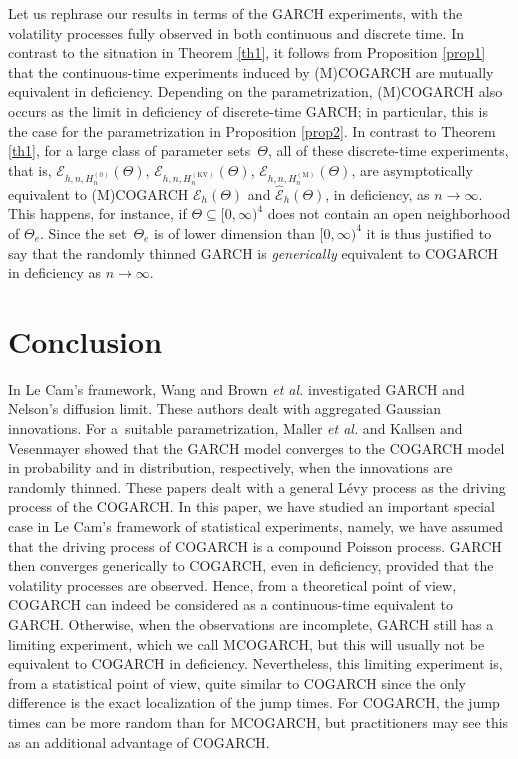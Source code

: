 \documentclass[number,citesort,seceqn,dvips]{arxbj}
\newcommand{\EEE}{{\mathcal E}}
\begin{document}
Let us rephrase our results in terms of the GARCH experiments, with the
volatility processes fully observed in both continuous and discrete
time. In contrast to the situation in Theorem \ref{th1}, it follows
from Proposition \ref{prop1} that the continuous-time experiments
induced by (M)COGARCH are mutually equivalent in deficiency. Depending
on the parametrization, (M)COGARCH also occurs as the limit in
deficiency of discrete-time GARCH; in particular, this is the case for
the parametrization in Proposition \ref{prop2}. In contrast to
Theorem \ref{th1}, for a large class of parameter sets~$\Theta$, all of
these discrete-time experiments, that is,
$\EEE_{h,n,H^{(0)}_n}(\Theta)$, $\EEE_{h,n,H^{\mathrm{(KV)}}_n}(\Theta)$,
$\EEE_{h,n,H_n^{\mathrm{(M)}}}(\Theta)$, are asymptotically equivalent to
(M)COGARCH $\EEE_h(\Theta)$ and $\widehat\EEE_h(\Theta)$, in
deficiency, as $n\to\infty$. This happens, for instance, if
$\Theta\subseteq[0,\infty)^4$ does not contain an open neighborhood of
$\Theta_{e}$. Since the set~$\Theta_e$ is of lower dimension than
$[0,\infty)^4$ it is thus justified to say that the randomly thinned
GARCH is \textit{generically} equivalent to COGARCH in deficiency as
$n\to\infty$.

\vspace*{-3pt}\section{Conclusion}\vspace*{-3pt}\label{summary}
In Le Cam's framework, Wang \cite{Wa02} and Brown \textit{et al.} \cite{BWZ03}
investigated GARCH and Nelson's diffusion limit. These authors dealt
with aggregated Gaussian innovations. For a~suitable parametrization,
Maller \textit{et al.} \cite{MMS08} and Kallsen and Vesenmayer \cite{KV07}
showed that the GARCH model converges to the COGARCH model in
probability and in distribution, respectively, when the innovations are
randomly thinned. These papers dealt with a general L\'{e}vy process as
the driving process of the COGARCH. In this paper, we have studied
an
important special case in Le Cam's framework of statistical
experiments, namely, we have assumed that the driving process of
CO\-GARCH is a compound Poisson process.
GARCH then converges generically to COGARCH, even in deficiency,
provided that the volatility processes are observed. Hence, from a
theoretical point of view, COGARCH can indeed be considered as a
continuous-time equivalent to GARCH.\vadjust{\goodbreak} Otherwise, when the observations
are incomplete, GARCH still has a limiting experiment, which we call
MCOGARCH, but this will usually not be equivalent to COGARCH in
deficiency. Nevertheless, this limiting experiment is, from a
statistical point of view, quite similar to COGARCH since the only
difference is the exact localization of the jump times. For COGARCH,
the jump times can be more random than for MCOGARCH, but practitioners
may see this as an additional advantage of COGARCH.
\end{document}
